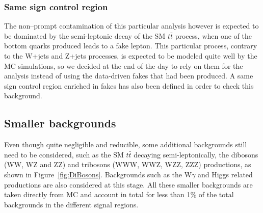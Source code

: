 \documentclass[a4paper, 10pt, openright]{report}
\begin{document}
\subsubsection*{Same sign control region}

The non--prompt contamination of this particular analysis however is expected to be dominated by the semi-leptonic decay of the \ac{SM} $t \bar t$ process, when one of the bottom quarks produced leads to a fake lepton. This particular process, contrary to the W+jets and Z+jets processes, is expected to be modeled quite well by the \ac{MC} simulations, so we decided at the end of the day to rely on them for the analysis instead of using the data-driven fakes that had been produced. A same sign control region enriched in fakes has also been defined in order to check this background. %

%
%

\subsection{Smaller backgrounds} \label{subsection:SmallerBkg}

Even though quite negligible and reducible, some additional backgrounds still need to be considered, such as the \ac{SM} $t \bar t$ decaying semi-leptonically, the dibosons (WW, WZ and ZZ) and tribosons (WWW, WWZ, WZZ, ZZZ) productions, as shown in Figure~\ref{fig:DiBosons}. Backgrounds such as the W$\gamma$ and Higgs related productions are also considered at this stage. All these smaller backgrounds are taken directly from \ac{MC} and account in total for less than 1\% of the total backgrounds in the different signal regions. 
\end{document}

